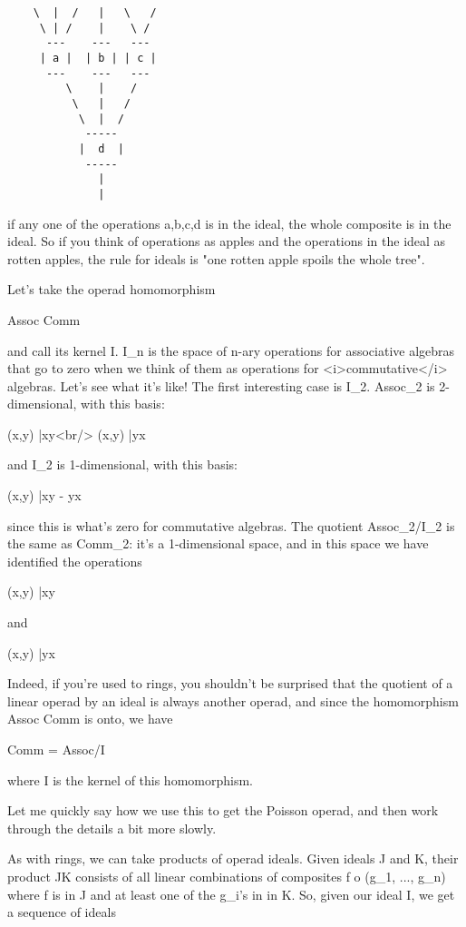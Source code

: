 \begin{verbatim}
    \  |  /   |   \   /    
     \ | /    |    \ /    
      ---    ---   ---   
     | a |  | b | | c | 
      ---    ---   --- 
         \    |    /
          \   |   /  
           \  |  / 
            ----- 
           |  d  |  
            -----  
              |   
              |  
\end{verbatim}
    
if any one of the operations a,b,c,d is in the ideal, the whole
composite is in the ideal.  So if you think of operations as
apples and the operations in the ideal as rotten apples, the rule 
for ideals is "one rotten apple spoils the whole
tree".  

Let's take the operad homomorphism

Assoc \to  Comm

and call its kernel I.  I_{n} is the space of n-ary operations
for associative algebras that go to zero when we think of them as
operations for <i>commutative</i> algebras.  Let's see what it's like!
The first interesting case is I_{2}.  Assoc_{2} is
2-dimensional, with this basis:

(x,y) |\to  xy<br/>
(x,y) |\to  yx

and I_{2} is 1-dimensional, with this basis:

(x,y) |\to  xy - yx

since this is what's zero for commutative algebras.  The quotient
Assoc_{2}/I_{2} is the same as Comm_{2}: it's
a 1-dimensional space, and in this space we have identified the
operations

(x,y) |\to  xy

and 

(x,y) |\to  yx

Indeed, if you're used to rings, you shouldn't be surprised
that the quotient of a linear operad by an ideal is always another
operad, and since the homomorphism Assoc \to  Comm is onto, we have

Comm = Assoc/I 

where I is the kernel of this homomorphism.

Let me quickly say how we use this to get the Poisson operad, and then
work through the details a bit more slowly.

As with rings, we can take products of operad ideals.  Given ideals J
and K, their product JK consists of all linear combinations of
composites f o (g_{1}, ..., g_{n}) where f is in J and
at least one of the g_{i}'s in in K.  So, given our ideal I,
we get a sequence of ideals

